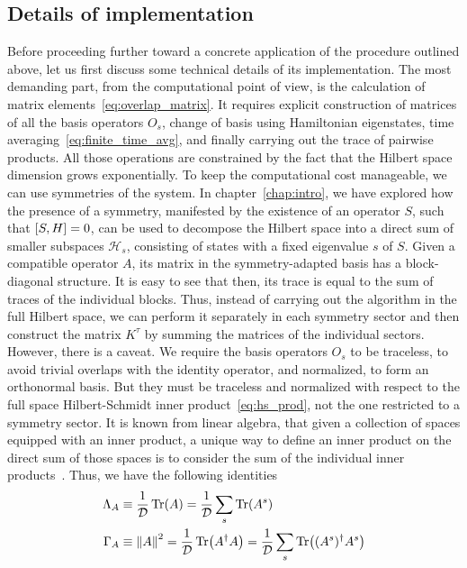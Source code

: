 \subsection{Details of implementation}
Before proceeding further toward a concrete application of the procedure outlined above, let us first discuss
 some technical details of its implementation. The most demanding part, from the computational point of view,
 is the calculation of matrix elements~\eqref{eq:overlap_matrix}. It requires explicit construction of
 matrices of all the basis operators \(O_s\), change of basis using Hamiltonian eigenstates,
 time averaging~\eqref{eq:finite_time_avg}, and finally carrying out the trace of pairwise products.
 All those operations are constrained by the fact that the Hilbert space dimension grows exponentially.
 To keep the computational cost manageable, we can use symmetries of the system. In chapter~\ref{chap:intro}, we
 have explored how the presence of a symmetry, manifested by the existence of an operator \(S\), such
 that \(\comm{S}{H} = 0\), can be used to decompose the Hilbert space into a direct sum of smaller
  subspaces \(\mathcal{H}_{s}\), consisting of states with a fixed eigenvalue \(s\) of \(S\). Given a
  compatible operator \(A\), its matrix in the symmetry-adapted basis has a block-diagonal structure.
  It is easy to see that then, its trace is equal to the sum of traces of the individual blocks.
  Thus, instead of carrying out the algorithm in the full Hilbert space, we can perform it separately
  in each symmetry sector and then construct the matrix \(K^{\tau}\) by summing the matrices of the
  individual sectors. However, there is a caveat. We require the basis operators \(O_s\) to be
  traceless, to avoid trivial overlaps with the identity operator, and normalized, to form an orthonormal
  basis. But they must be traceless and normalized with respect to the full space Hilbert-Schmidt inner
  product~\eqref{eq:hs_prod}, not the one restricted to a symmetry sector. It is known from linear algebra,
  that given a collection of spaces equipped with an inner product, a unique way to define an inner product
  on the direct sum of those spaces is to consider the sum of the individual inner products~\autocite{Conway2007}.
  Thus, we have the following identities
  \begin{align}
    \Lambda_A &\equiv \frac{1}{\mathcal{D}} \Tr(A) = \frac{1}{\mathcal{D}} \sum_{s} \Tr(A^s)\\
    \Gamma_A &\equiv \norm{A}^2 = \frac{1}{\mathcal{D}} \Tr(A^{\dag}A) = \frac{1}{\mathcal{D}} \sum_{s} \Tr((A^s)^{\dag}A^s)
  \end{align}
